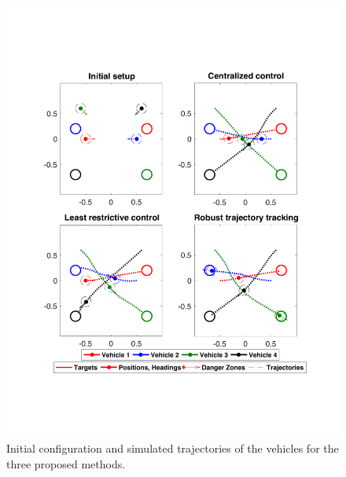 \begin{figure}[h!]
  \centering
  \includegraphics[width=0.8\columnwidth]{"fig/allTrajs"}
  \caption{Initial configuration and simulated trajectories of the vehicles for the three proposed methods.}
  \label{fig:allTrajs}
\end{figure}

